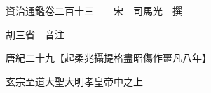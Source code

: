 










 


 
 


 

  
  
  
  
  





  
  
  
  
  
 
  

  

  
  
  



  

 
 

  
   




  

  
  


  　　資治通鑑卷二百十三　　宋　司馬光　撰

　　胡三省　音注

　　唐紀二十九【起柔兆攝提格盡昭傷作噩凡八年】

　　玄宗至道大聖大明孝皇帝中之上


